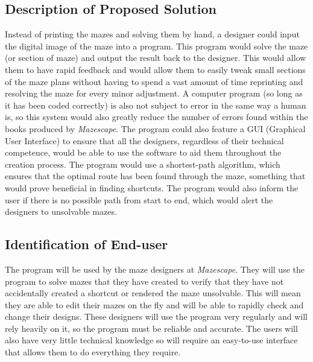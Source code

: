\documentclass[titlepage]{article}
\begin{document}
\subsection{Description of Proposed Solution}
Instead of printing the mazes and solving them by hand, a designer could input the digital image of the maze into a program. This program would solve the maze (or section of maze) and output the result back to the designer. This would allow them to have rapid feedback and would allow them to easily tweak small sections of the maze plans without having to spend a vast amount of time reprinting and resolving the maze for every minor adjustment. A computer program (so long as it has been coded correctly) is also not subject to error in the same way a human is, so this system would also greatly reduce the number of errors found within the books produced by \textit{Mazescape}. The program could also feature a GUI (Graphical User Interface) to ensure that all the designers, regardless of their technical competence, would be able to use the software to aid them throughout the creation process. The program would use a shortest-path algorithm, which ensures that the optimal route has been found through the maze, something that would prove beneficial in finding shortcuts. The program would also inform the user if there is no possible path from start to end, which would alert the designers to unsolvable mazes. 


\subsection{Identification of End-user}
The program will be used by the maze designers at \textit{Mazescape}. They will use the program to solve mazes that they have created to verify that they have not accidentally created a shortcut or rendered the maze unsolvable. This will mean they are able to edit their mazes on the fly and will be able to rapidly check and change their designs. These designers will use the program very regularly and will rely heavily on it, so the program must be reliable and accurate. The users will also have very little technical knowledge so will require an easy-to-use interface that allows them to do everything they require. 
\end{document}
